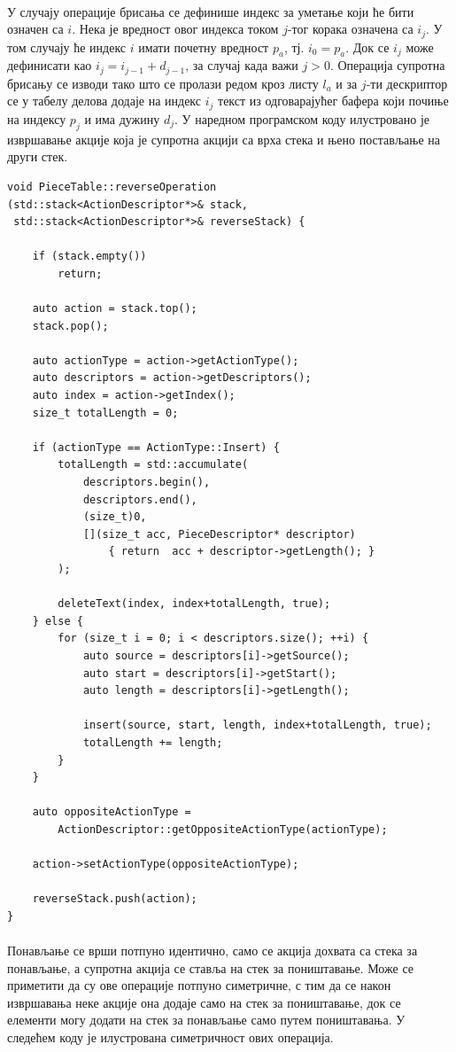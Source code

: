 \documentclass[12pt,oneside]{memoir}
\begin{document}
\paragraph{}
У случају операције брисања се дефинише индекс за уметање који ће бити означен са \(i\). Нека је вредност овог индекса током \(j\)-тог корака означена са
\(i_j\). У том случају ће индекс \(i\) имати почетну вредност \(p_a\), тј. \(i_0 = p_a\). Док се \(i_j\) може дефинисати као \(i_j = i_{j-1} + d_{j-1}\),
за случај када важи \(j > 0\). Операција супротна брисању се изводи тако што се пролази редом кроз листу \(l_a\) и за \(j\)-ти дескриптор се у табелу делова додаје на индекс \(i_j\) текст из одговарајућег бафера који почиње на индексу \(p_j\) и има дужину \(d_j\). У наредном програмском коду илустровано је
извршавање акције која је супротна акцији са врха стека и њено постављање на
други стек.

\begin{verbatim}
void PieceTable::reverseOperation
(std::stack<ActionDescriptor*>& stack, 
 std::stack<ActionDescriptor*>& reverseStack) {
	
	if (stack.empty())
		return;
	
	auto action = stack.top();
	stack.pop();
	
	auto actionType = action->getActionType();
	auto descriptors = action->getDescriptors();
	auto index = action->getIndex();
	size_t totalLength = 0;
	
	if (actionType == ActionType::Insert) {
		totalLength = std::accumulate(
			descriptors.begin(), 
			descriptors.end(), 
			(size_t)0,
			[](size_t acc, PieceDescriptor* descriptor) 
				{ return  acc + descriptor->getLength(); }
		);
		
		deleteText(index, index+totalLength, true);
	} else {
		for (size_t i = 0; i < descriptors.size(); ++i) {
			auto source = descriptors[i]->getSource();
			auto start = descriptors[i]->getStart();
			auto length = descriptors[i]->getLength();
			
			insert(source, start, length, index+totalLength, true);
			totalLength += length;
		}
	}
	
	auto oppositeActionType = 
		ActionDescriptor::getOppositeActionType(actionType);
		
	action->setActionType(oppositeActionType);
	
	reverseStack.push(action);
}
\end{verbatim}

\paragraph{}
Понављање се врши потпуно идентично, само се акција дохвата
са стека за понављање, а супротна акција се ставља на стек за поништавање. 
Може се приметити да су ове операције потпуно симетричне, с тим да се након 
извршавања неке акције она додаје само на стек за поништавање, док се елементи могу додати на стек за понављање само путем поништавања. У следећем
коду је илустрована симетричност ових операција.
\end{document}
